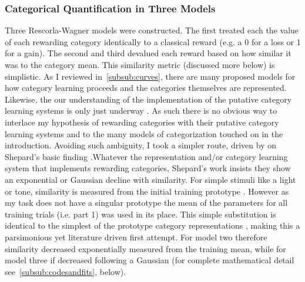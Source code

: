 \documentclass[doc,12pt]{apa}        %
\begin{document}
\subsubsection{Categorical Quantification in Three Models}
\label{subsub:catquant}
Three Rescorla-Wagner models were constructed.  The first treated each the value of each rewarding category identically to a classical reward (e.g. a 0 for a loss or 1 for a gain).  The second and third devalued each reward based on how similar it was to the category mean.  This similarity metric (discussed more below) is simplistic.  As I reviewed in~\ref{subsub:curves}, there are many proposed models for how category learning proceeds and the categories themselves are represented.  Likewise, the our understanding of the implementation of the putative category learning systems is only just underway \cite{Ashby:2005p9152,Ashby:2006p9153}.  As such there is no obvious way to interlace my hypothesis of rewarding categories with their putative category learning systems and to the many models of categorization touched on in the introduction.  Avoiding such ambiguity, I took a simpler route, driven by on Shepard's basic finding \cite{Shepard:1987p9102}.Whatever the representation and/or category learning system that implements rewarding categories, Shepard's work insists they show an exponential or Gaussian decline with similarity.  For simple stimuli like a light or tone, similarity is measured from the initial training prototype \cite{Guttman:1956p8355}.  However as my task does not have a singular prototype the mean of the parameters for all training trials (i.e. part 1) was used in its place.  This simple substitution is identical to the simplest of the prototype category representations \cite{Rosch:1973p9108,Ashby:1995p9109}, making this a parsimonious yet literature driven first attempt.  For model two therefore similarity decreased exponentially measured from the training mean, while for model three if decreased following a Gaussian (for complete mathematical detail see~\ref{subsub:codesandfits}, below).  
\end{document}
